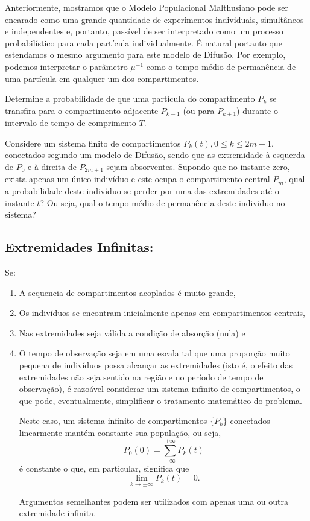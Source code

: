     Anteriormente, mostramos que o Modelo Populacional Malthusiano pode ser encarado como uma grande quantidade de experimentos individuais, simultâneos e independentes e, portanto, passível de ser interpretado como um processo probabilístico para cada partícula individualmente. É natural portanto que estendamos o mesmo argumento para este modelo de Difusão. Por exemplo, podemos interpretar o parâmetro \(\mu^{-1}\) como o tempo médio de permanência de uma partícula em qualquer um dos compartimentos.


    \begin{exercise}
    Determine a probabilidade de que uma partícula do compartimento \(P_k\) se transfira para o compartimento adjacente \(P_{k-1}\) (ou para \(P_{k+1}\)) durante o intervalo de tempo de comprimento \(T\).
    \end{exercise}

    \begin{exercise}
    Considere um sistema finito de compartimentos \(P_k(t), 0 \le k \le 2m+1\), conectados segundo um modelo de Difusão, sendo que as extremidade à esquerda de \(P_0\) e à direita de \(P_{2m+1}\) sejam absorventes. Supondo que no instante zero, exista apenas um único indivíduo e este ocupa o compartimento central \(P_m\), qual a probabilidade deste indivíduo se perder por uma das extremidades até o instante \(t\)? Ou seja, qual o tempo médio de permanência deste individuo no sistema?
    \end{exercise}

\subsection*{Extremidades Infinitas:}

    Se:
    \begin{enumerate}
    \item A sequencia de compartimentos acoplados é muito grande,
    \item Os indivíduos se encontram inicialmente apenas em compartimentos centrais, 
    \item Nas extremidades seja válida a condição de absorção (nula) e 
    \item O tempo de observação seja em uma escala tal que uma proporção muito pequena de indivíduos possa alcançar as extremidades (isto é, o efeito das extremidades não seja sentido na região e no período de tempo de observação), é razoável considerar um sistema infinito de compartimentos, o que pode, eventualmente, simplificar o tratamento matemático do problema.

    Neste caso, um sistema infinito de compartimentos \(\{P_k\}\) conectados linearmente mantém constante sua população, ou seja,
    \[P_0(0) = \sum_{-\infty}^{+\infty} P_k(t)\]
    é constante o que, em particular, significa que
    \[\lim_{k \to \pm\infty} P_k(t) = 0.\]

    Argumentos semelhantes podem ser utilizados com apenas uma ou outra extremidade infinita.
    \end{enumerate}

